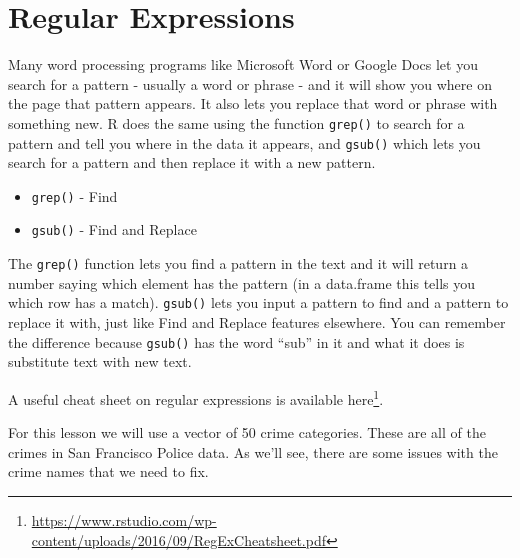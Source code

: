 \documentclass[
]{krantz}
\providecommand{\tightlist}{%
  \setlength{\itemsep}{0pt}\setlength{\parskip}{0pt}}
\renewcommand{\href}[2]{#2\footnote{\url{#1}}}
\begin{document}
\hypertarget{regular-expressions}{%
\chapter{Regular Expressions}\label{regular-expressions}}

Many word processing programs like Microsoft Word or Google Docs let you search for a pattern - usually a word or phrase - and it will show you where on the page that pattern appears. It also lets you replace that word or phrase with something new. R does the same using the function \texttt{grep()} to search for a pattern and tell you where in the data it appears, and \texttt{gsub()} which lets you search for a pattern and then replace it with a new pattern.

\begin{itemize}
\tightlist
\item
  \texttt{grep()} - Find
\item
  \texttt{gsub()} - Find and Replace
\end{itemize}

The \texttt{grep()} function lets you find a pattern in the text and it will return a number saying which element has the pattern (in a data.frame this tells you which row has a match). \texttt{gsub()} lets you input a pattern to find and a pattern to replace it with, just like Find and Replace features elsewhere. You can remember the difference because \texttt{gsub()} has the word ``sub'' in it and what it does is substitute text with new text.

A useful cheat sheet on regular expressions is available \href{https://www.rstudio.com/wp-content/uploads/2016/09/RegExCheatsheet.pdf}{here}.

For this lesson we will use a vector of 50 crime categories. These are all of the crimes in San Francisco Police data. As we'll see, there are some issues with the crime names that we need to fix.
\end{document}
